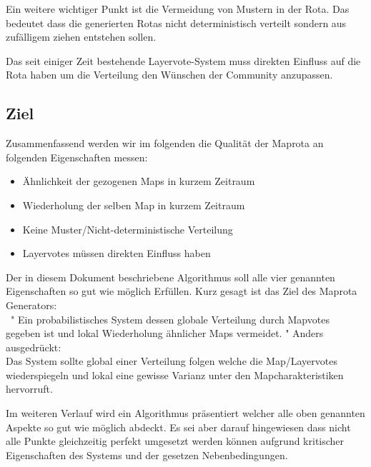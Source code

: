             Ein weitere wichtiger Punkt ist die Vermeidung von Mustern in der Rota. 
            Das bedeutet dass die generierten Rotas nicht deterministisch verteilt sondern aus zufälligem ziehen entstehen sollen.
            
            Das seit einiger Zeit bestehende Layervote-System muss direkten Einfluss auf die Rota haben um die Verteilung den Wünschen der Community anzupassen.

        \subsection{Ziel}
            Zusammenfassend werden wir im folgenden die Qualität der Maprota an folgenden Eigenschaften messen:
            \begin{itemize}
                \item Ähnlichkeit der gezogenen Maps in kurzem Zeitraum
                \item Wiederholung der selben Map in kurzem Zeitraum
                \item Keine Muster/Nicht-deterministische Verteilung 
                \item Layervotes müssen direkten Einfluss haben 
            \end{itemize}

            Der in diesem Dokument beschriebene Algorithmus soll alle vier genannten Eigenschaften so gut wie möglich Erfüllen.
            Kurz gesagt ist das Ziel des Maprota Generators:\\\
            " Ein probabilistisches System dessen globale Verteilung durch Mapvotes gegeben ist und lokal Wiederholung ähnlicher Maps vermeidet. "
            Anders ausgedrückt:\\
            Das System sollte global einer Verteilung folgen welche die Map/Layervotes wiederspiegeln und lokal eine gewisse Varianz unter den Mapcharakteristiken hervorruft.

            Im weiteren Verlauf wird ein Algorithmus präsentiert welcher alle oben genannten Aspekte so gut wie möglich abdeckt. 
            Es sei aber darauf hingewiesen dass nicht alle Punkte gleichzeitig perfekt umgesetzt werden können aufgrund kritischer Eigenschaften des Systems und der gesetzen Nebenbedingungen.
